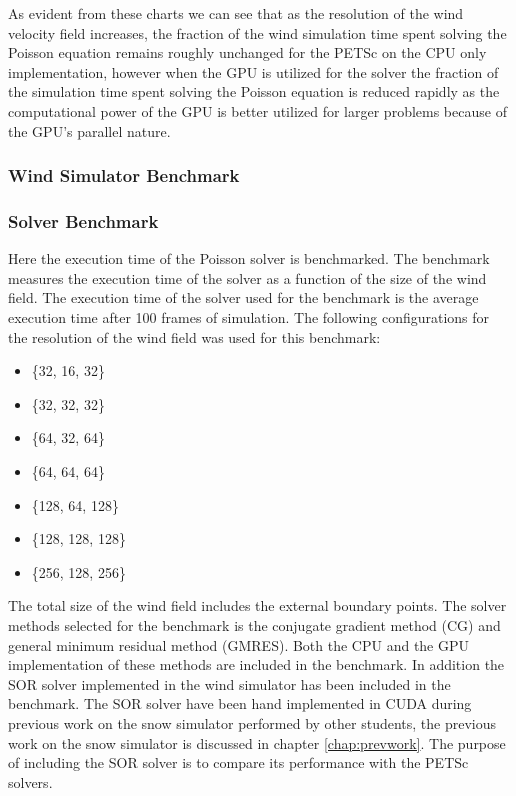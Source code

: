 As evident from these charts we can see that as the resolution of the wind
velocity field increases, the fraction of the wind simulation time spent solving
the Poisson equation remains roughly unchanged for the PETSc on the CPU only
implementation, however when the GPU is utilized for the solver the fraction of
the simulation time spent solving the Poisson equation is reduced rapidly as
the computational power of the GPU is better utilized for larger problems because
of the GPU's parallel nature.

\subsubsection{Wind Simulator Benchmark}


\subsubsection{Solver Benchmark}



Here the execution time of the Poisson solver is benchmarked. The benchmark
measures the execution time of the solver as a function of the size of the
wind field. The execution time of the solver used for the benchmark is the
average execution time after 100 frames of simulation. The following
configurations for the resolution of the wind field was used for this benchmark:
\begin{itemize}
	\item \{32, 16, 32\}
	\item \{32, 32, 32\}
	\item \{64, 32, 64\}
	\item \{64, 64, 64\}
	\item \{128, 64, 128\}
	\item \{128, 128, 128\}
	\item \{256, 128, 256\}
\end{itemize}
The total size of the wind field includes the external boundary points.
The solver methods selected for the benchmark is the conjugate gradient method
(CG) and general minimum residual method (GMRES). Both the CPU and the GPU
implementation of these methods are included in the benchmark. In addition the
SOR solver implemented in the wind simulator has been included in the benchmark.
The SOR solver have been hand implemented in CUDA during previous work on the
snow simulator performed by other students, the previous work on the snow
simulator is discussed in chapter \ref{chap:prevwork}. The purpose of including
the SOR solver is to compare its performance with the PETSc solvers.

